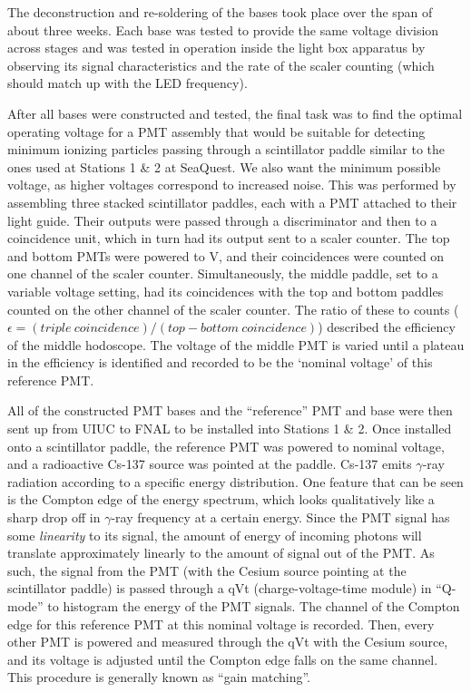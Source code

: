 The deconstruction and re-soldering of the bases took place over the span of about three weeks. Each base was tested to provide the same voltage division across stages and was tested in operation inside the light box apparatus by observing its signal characteristics and the rate of the scaler counting (which should match up with the LED frequency).

After all bases were constructed and tested, the final task was to find the optimal operating voltage for a PMT assembly that would be suitable for detecting minimum ionizing particles passing through a scintillator paddle similar to the ones used at Stations 1 \& 2 at SeaQuest. We also want the minimum possible voltage, as higher voltages correspond to increased noise. This was performed by assembling three stacked scintillator paddles, each  with a PMT attached to their light guide. Their outputs were passed through a discriminator and then to a coincidence unit, which in turn had its output sent to a scaler counter. The top and bottom PMTs were powered to \unit[-1500]{V}, and their coincidences were counted on one channel of the scaler counter. Simultaneously, the middle paddle, set to a variable voltage setting, had its coincidences with the top and bottom paddles counted on the other channel of the scaler counter. The ratio of these to counts ($\epsilon = (triple\ coincidence) / (top-bottom\ coincidence)$) described the efficiency of the middle hodoscope. The voltage of the middle PMT is varied until a plateau in the efficiency is identified and recorded to be the `nominal voltage' of this reference PMT.

All of the constructed PMT bases and the ``reference'' PMT and base were then sent up from UIUC to FNAL to be installed into Stations 1 \& 2. Once installed onto a scintillator paddle, the reference PMT was powered to nominal voltage, and a radioactive Cs-137 source was pointed at the paddle. Cs-137 emits $\gamma$-ray radiation according to a specific energy distribution. One feature that can be seen is the Compton edge of the energy spectrum, which looks qualitatively like a sharp drop off in $\gamma$-ray frequency at a certain energy. Since the PMT signal has some \emph{linearity} to its signal, the amount of energy of incoming photons will translate approximately linearly to the amount of signal out of the PMT. As such, the signal from the PMT (with the Cesium source pointing at the scintillator paddle) is passed through a qVt (charge-voltage-time module) in ``Q-mode'' to histogram the energy of the PMT signals. The channel of the Compton edge for this reference PMT at this nominal voltage is recorded. Then, every other PMT is powered and measured through the qVt with the Cesium source, and its voltage is adjusted until the Compton edge falls on the same channel. This procedure is generally known as ``gain matching''.

